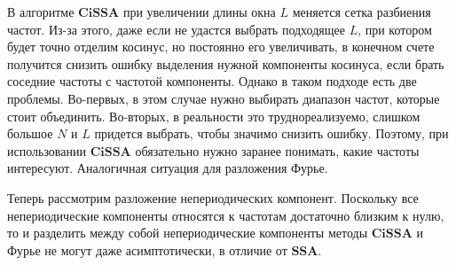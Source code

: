 \documentclass[a4paper, 11pt]{article}
\newcommand{\SSA}{\textbf{SSA}}
\newcommand{\CISSA}{\textbf{CiSSA}}
\begin{document}
В алгоритме $\CISSA$ при увеличении длины окна $L$ меняется сетка разбиения частот. Из-за этого, даже если не удастся выбрать подходящее $L$, при котором будет точно отделим косинус, но постоянно его увеличивать, в конечном счете получится снизить ошибку выделения нужной компоненты косинуса, если брать соседние частоты с частотой компоненты. Однако в таком подходе есть две проблемы. Во-первых, в этом случае нужно выбирать диапазон частот, которые стоит объединить. Во-вторых, в реальности это труднореализуемо, слишком большое $N$ и $L$ придется выбрать, чтобы значимо снизить ошибку. Поэтому, при использовании $\CISSA$ обязательно нужно заранее понимать, какие частоты интересуют. Аналогичная ситуация для разложения Фурье.

Теперь рассмотрим разложение непериодических компонент. Поскольку все непериодические компоненты относятся к частотам достаточно близким к нулю, то и разделить между собой непериодические компоненты методы $\CISSA$ и Фурье не могут даже асимптотически, в отличие от $\SSA$. 
\end{document}
